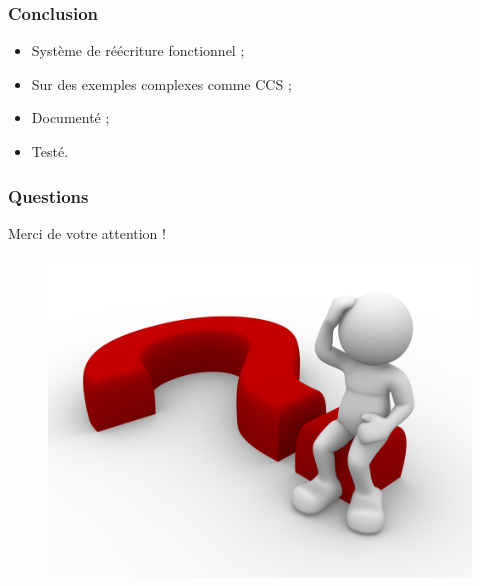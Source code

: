 \documentclass[xcolor=dvipsnames]{beamer}
\begin{document}
\begin{frame}
\frametitle{Conclusion}
\begin{itemize}
\item Système de réécriture fonctionnel ;
\item Sur des exemples complexes comme CCS ;
\item Documenté ;
\item Testé.
\end{itemize}
\end{frame}

\begin{frame}
\frametitle{Questions}
\begin{center}
\Large{Merci de votre attention !}
\end{center}
\begin{figure}[p]
  \centering
  \includegraphics[scale=0.6]{imports/question.jpeg}
\end{figure}
\end{frame}
\end{document}
